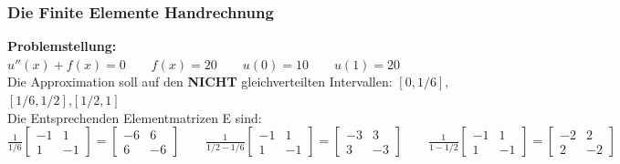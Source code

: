 \subsubsection{Die Finite Elemente Handrechnung}
\textbf{Problemstellung:} $u''(x)+f(x)=0\qquad f(x)=20\qquad u(0)=10\qquad u(1)=20$\\

Die Approximation soll auf den \textbf{NICHT} gleichverteilten Intervallen: $[0,1/6]$,\quad $[1/6,1/2]$,\quad $[1/2,1]$\\

Die Entsprechenden Elementmatrizen E sind:\\

$
	\frac{1}{1/6}\begin{bmatrix}
		-1 & 1\\
		1 & -1
	\end{bmatrix}=
	\begin{bmatrix}
			-6 & 6\\
			6 & -6
	\end{bmatrix}\qquad
	\frac{1}{1/2-1/6}\begin{bmatrix}
		-1 & 1\\
		1 & -1
	\end{bmatrix}=
	\begin{bmatrix}
		-3 & 3\\
		3 & -3
	\end{bmatrix}\qquad
	\frac{1}{1-1/2}\begin{bmatrix}
		-1 & 1\\
		1 & -1
	\end{bmatrix}=
	\begin{bmatrix}
		-2 & 2\\
		2 & -2
	\end{bmatrix}
$\\
\\

